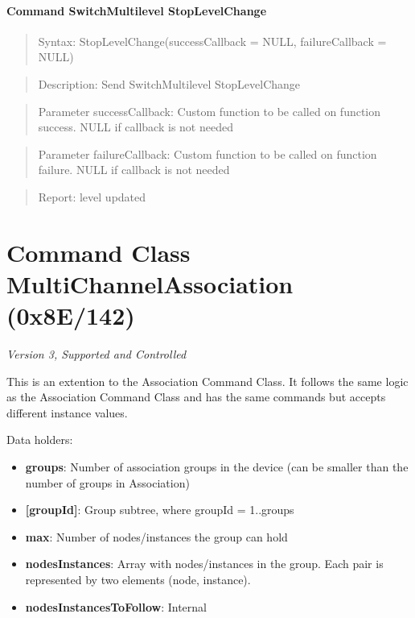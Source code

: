 \paragraph{Command SwitchMultilevel StopLevelChange}
\begin{quote}Syntax: StopLevelChange(successCallback = NULL, failureCallback = NULL)\end{quote}
\begin{quote}Description: Send SwitchMultilevel StopLevelChange\end{quote}
\begin{quote}Parameter successCallback: Custom function to be called on function success. NULL if callback is not needed\end{quote}
\begin{quote}Parameter failureCallback: Custom function to be called on function failure. NULL if callback is not needed\end{quote}
\begin{quote}Report: level updated\end{quote}


\section{Command Class MultiChannelAssociation (0x8E/142)}

\textit{Version 3, Supported and Controlled}
\newline

This is an extention to the Association Command Class. It follows the same logic as the Association Command Class and has the same commands but accepts different instance values.
\newline

\noindent
Data holders:

\begin{itemize}
\item \textbf{groups}: Number of association groups in the device (can be smaller than the number of groups in Association)
\item \textbf{[groupId]}: Group subtree, where groupId = 1..groups
\item \qquad\textbf{max}: Number of nodes/instances the group can hold
\item \qquad\textbf{nodesInstances}: Array with nodes/instances in the group. Each pair is represented by two elements (node, instance).
\item \qquad\textbf{nodesInstancesToFollow}: Internal
\end{itemize}

